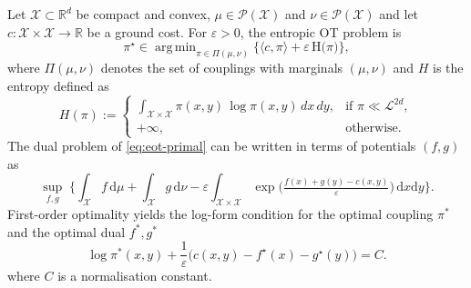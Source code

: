 \documentclass[11pt]{article}
\DeclareMathOperator*{\argmin}{arg\,min}
\theoremstyle{definition}
\numberwithin{equation}{section}%
\begin{document}
Let $\mathcal{X}\subset\mathbb{R}^d$ be compact and convex, $\mu\in\mathcal{P}(\mathcal{X})$ and $\nu\in\mathcal{P}(\mathcal{X})$ and let $c:\mathcal{X}\times\mathcal{X}\to\mathbb{R}$ be a ground cost. For $\varepsilon>0$, the entropic OT problem is
\begin{equation}
\pi^\star \in \argmin_{\pi\in\Pi(\mu,\nu)}
\Big\{\langle c,\pi\rangle+\varepsilon\,\mathrm{H}\big(\pi\big)\Big\},
\label{eq:eot-primal}
\end{equation}
where $\Pi(\mu,\nu)$ denotes the set of couplings with marginals $(\mu,\nu)$ and $H$ is the entropy defined as
\[
H(\pi)
:=
\begin{cases}
\displaystyle \int_{\mathcal{X}\times\mathcal{X}}
\pi(x,y)\,\log \pi(x,y)\,dx\,dy,
& \text{if }\pi\ll \mathcal{L}^{2d},\\[1.2ex]
+\infty, & \text{otherwise.}
\end{cases}
\]
The dual problem of \eqref{eq:eot-primal} can be written in terms of potentials $(f,g)$ as
\begin{equation}
\sup_{f,g}\;
\Big\{\int_{\mathcal{X}} f\,\mathrm{d}\mu + \int_{\mathcal{X}} g\,\mathrm{d}\nu
-\varepsilon \int_{\mathcal{X}\times\mathcal{X}}
\exp\!\Big(\tfrac{f(x)+g(y)-c(x,y)}{\varepsilon}\Big)\,\mathrm{d}x\mathrm{d}y\Big\}.
\label{eq:eot-dual}
\end{equation}
First-order optimality yields the log-form condition for the optimal coupling $\pi^*$ and the optimal dual $f^*, g^*$
\begin{equation}
\log \pi^*(x,y) + \frac{1}{\varepsilon}\Big(c(x,y)-f^\star(x)-g^\star(y)\Big) = C.
\label{eq:eot-foc-log}
\end{equation}
where $C$ is a normalisation constant.


\end{document}
